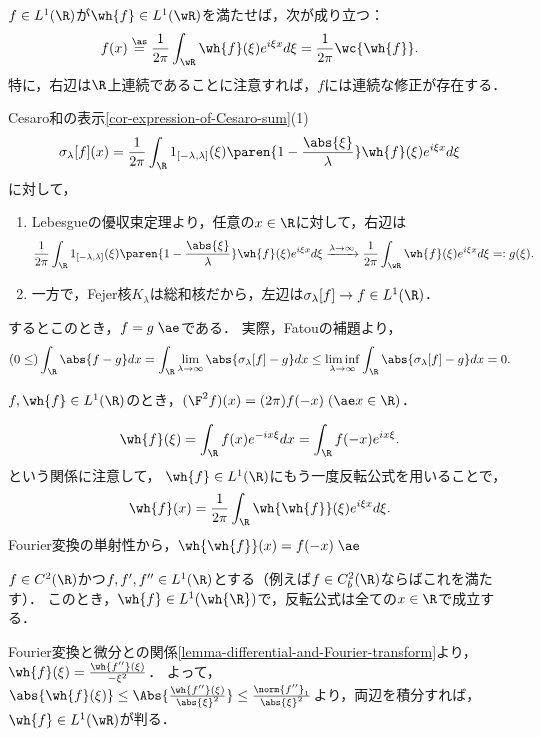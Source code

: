 \documentclass[uplatex,dvipdfmx]{jsreport}
\begin{document}
\begin{corollary}[反転公式]\label{cor-inversion-theorem-in-R1}
    $f\in L^1(\R)$が$\wh{f}\in L^1(\wR)$を満たせば，次が成り立つ：
    \[f(x)\overset{\as}{=}\frac{1}{2\pi}\int_{\wR}\wh{f}(\xi)e^{i\xi x}d\xi=\frac{1}{2\pi}\wc{\wh{f}}.\]
    特に，右辺は$\R$上連続であることに注意すれば，$f$には連続な修正が存在する．
\end{corollary}
\begin{Proof}
    Cesaro和の表示\ref{cor-expression-of-Cesaro-sum}(1)
    \[\sigma_\lambda[f](x)=\frac{1}{2\pi}\int_\R1_{[-\lambda,\lambda]}(\xi)\paren{1-\frac{\abs{\xi}}{\lambda}}\wh{f}(\xi)e^{i\xi x}d\xi\]
    に対して，
    \begin{enumerate}
        \item Lebesgueの優収束定理より，任意の$x\in\R$に対して，右辺は
        \[\frac{1}{2\pi}\int_\R1_{[-\lambda,\lambda]}(\xi)\paren{1-\frac{\abs{\xi}}{\lambda}}\wh{f}(\xi)e^{i\xi x}d\xi\xrightarrow{\lambda\to\infty}\frac{1}{2\pi}\int_{\wR}\wh{f}(\xi)e^{i\xi x}d\xi=:g(\xi).\]
        \item 一方で，Fejer核$K_\lambda$は総和核だから，左辺は$\sigma_\lambda[f]\to f\in L^1(\R)$．
    \end{enumerate}
    するとこのとき，$f=g\;\ae$である．
    実際，Fatouの補題より，
    \[(0\le)\int_\R\abs{f-g}dx=\int_\R\lim_{\lambda\to\infty}\abs{\sigma_\lambda[f]-g}dx\le\liminf_{\lambda\to\infty}\int_\R\abs{\sigma_\lambda[f]-g}dx=0.\]
\end{Proof}

\begin{corollary}\label{cor-twice-Fourier-transform-in-R1}
    $f,\wh{f}\in L^1(\R)$のとき，$(\F^2 f)(x)=(2\pi)f(-x)\;(\ae x\in\R)$．
\end{corollary}
\begin{Proof}
    \[\wh{f}(\xi)=\int_{\R}f(x)e^{-ix\xi}dx=\int_\R f(-x)e^{ix\xi}.\]
    という関係に注意して，
    $\wh{f}\in L^1(\R)$にもう一度反転公式を用いることで，
    \[\wh{f}(x)=\frac{1}{2\pi}\int_\R\wh{\wh{f}}(\xi)e^{i\xi x}d\xi.\]
    Fourier変換の単射性から，$\wh{\wh{f}}(x)=f(-x)\;\ae$
\end{Proof}

\begin{proposition}[反転可能性の十分条件]\label{prop-sufficient-condition-to-invert-Fourier-transform}
    $f\in C^2(\R)$かつ$f,f',f''\in L^1(\R)$とする（例えば$f\in C_b^2(\R)$ならばこれを満たす）．
    このとき，$\wh{f}\in L^1(\wh{\R})$で，反転公式は全ての$x\in\R$で成立する．
\end{proposition}
\begin{Proof}
    Fourier変換と微分との関係\ref{lemma-differential-and-Fourier-transform}より，$\wh{f}(\xi)=\frac{\wh{f''}(\xi)}{-\xi^2}$．
    よって，$\abs{\wh{f}(\xi)}\le\Abs{\frac{\wh{f''}(\xi)}{\abs{\xi}^2}}\le\frac{\norm{f''}_1}{\abs{\xi}^2}$より，両辺を積分すれば，$\wh{f}\in L^1(\wR)$が判る．
\end{Proof}
\end{document}
